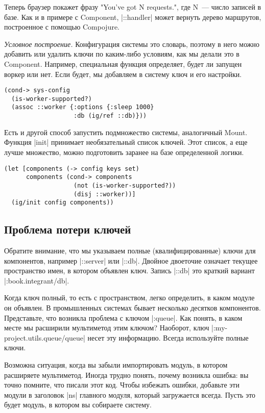 Теперь браузер покажет фразу "You've got N requests.", где N~--- число записей в
базе. Как и в примере с Component, \spverb|::handler| может вернуть дерево маршрутов,
построенное с помощью Compojure.

\emph{Условное построение.} Конфигурация системы это словарь, поэтому в него можно
добавить или удалить ключи по каким-либо условиям, как мы делали это в
Component. Например, специальная функция определяет, будет ли запущен воркер или
нет. Если будет, мы добавляем в систему ключ и его настройки.

\begin{verbatim}
(cond-> sys-config
  (is-worker-supported?)
  (assoc ::worker {:options {:sleep 1000}
                   :db (ig/ref ::db)}))
\end{verbatim}

Есть и другой способ запустить подмножество системы, аналогичный Mount. Функция
\spverb|init| принимает необязательный список ключей. Этот список, а еще лучше
множество, можно подготовить заранее на базе определенной логики.

\begin{verbatim}
(let [components (-> config keys set)
      components (cond-> components
                   (not (is-worker-supported?))
                   (disj ::worker))]
  (ig/init config components))
\end{verbatim}

\subsection{Проблема потери ключей}

Обратите внимание, что мы указываем полные (квалифицированные) ключи для
компонентов, например \spverb|::server| или \spverb|::db|. Двойное двоеточие означает текущее
пространство имен, в котором объявлен ключ. Запись \spverb|::db| это краткий вариант
\spverb|:book.integrant/db|.

Когда ключ полный, то есть с пространством, легко определить, в каком модуле он
объявлен. В промышленных системах бывает несколько десятков
компонентов. Представьте, что возникла проблема с ключом \spverb|:queue|. Как понять, в
каком месте мы расширили мультиметод этим ключом? Наоборот, ключ
\spverb|:my-project.utils.queue/queue| несет эту информацию. Всегда используйте полные
ключи.

Возможна ситуация, когда вы забыли импортировать модуль, в котором расширяете
мультиметод. Иногда трудно понять, почему возникла ошибка: вы точно помните, что
писали этот код. Чтобы избежать ошибки, добавьте эти модули в заголовок \spverb|ns|
главного модуля, который загружается всегда. Пусть это будет модуль, в котором
вы собираете систему.

